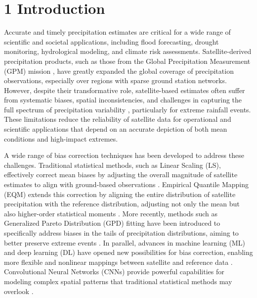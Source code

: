 \documentclass[
]{article}
\begin{document}
\begin{abstract}
\textbf{Keywords:} Bias Correction, Satellite Precipitation, IMERG,
Daily Precipitation, Extreme Events, Deep Learning, Quantile Mapping,
Generalized Pareto Distribution, Quality Assessment, Indonesia
\end{abstract}


\section{1 Introduction}\label{introduction}

Accurate and timely precipitation estimates are critical for a wide
range of scientific and societal applications, including flood
forecasting, drought monitoring, hydrological modeling, and climate risk
assessments. Satellite-derived precipitation products, such as those
from the Global Precipitation Measurement (GPM) mission \cite{ref1,ref2}, have
greatly expanded the global coverage of precipitation observations,
especially over regions with sparse ground station networks. However,
despite their transformative role, satellite-based estimates often
suffer from systematic biases, spatial inconsistencies, and challenges
in capturing the full spectrum of precipitation variability \cite{ref3},
particularly for extreme rainfall events. These limitations reduce the
reliability of satellite data for operational and scientific
applications that depend on an accurate depiction of both mean
conditions and high-impact extremes.

A wide range of bias correction techniques has been developed to address
these challenges. Traditional statistical methods, such as Linear
Scaling (LS), effectively correct mean biases by adjusting the overall
magnitude of satellite estimates to align with ground-based observations
\cite{ref4}. Empirical Quantile Mapping (EQM) extends this correction by
aligning the entire distribution of satellite precipitation with the
reference distribution, adjusting not only the mean but also
higher-order statistical moments \cite{ref5,ref6}. More recently, methods such
as Generalized Pareto Distribution (GPD) fitting have been introduced to
specifically address biases in the tails of precipitation distributions,
aiming to better preserve extreme events \cite{ref7}. In parallel, advances
in machine learning (ML) and deep learning (DL) have opened new
possibilities for bias correction, enabling more flexible and nonlinear
mappings between satellite and reference data \cite{ref8}. Convolutional
Neural Networks (CNNs) provide powerful capabilities for modeling
complex spatial patterns that traditional statistical methods may
overlook \cite{ref9,ref10}.
\end{document}
